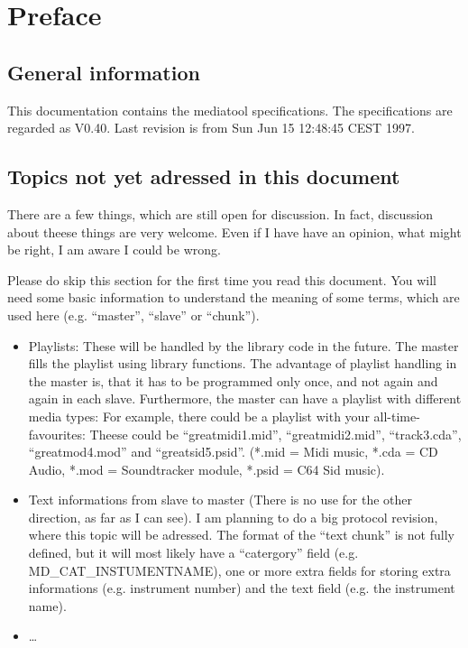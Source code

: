 

\section{Preface}


\subsection*{General information}
This documentation contains the mediatool specifications.
The specifications are regarded as V0.40. Last revision is from Sun Jun 15 12:48:45 CEST 1997.


\subsection*{Topics not yet adressed in this document}
There are a few things, which are still open for discussion. In fact, discussion about
theese things are very welcome. Even if I have have an opinion, what might be right,
I am aware I could be wrong.

Please do skip this section for the first time you read this document. You will need
some basic information to understand the meaning of some terms, which are used here
(e.g. ``master'', ``slave'' or ``chunk'').

\begin{itemize}
\item	Playlists: These will be handled by the library code in the future. The master fills
	the playlist using library functions. The advantage of playlist handling in the master
	is, that it has to be programmed only once, and not again and again in
	each slave. Furthermore, the master can have a playlist with different media types:
	For example, there could be a playlist with your all-time-favourites: Theese could
	be ``greatmidi1.mid'', ``greatmidi2.mid'', ``track3.cda'', ``greatmod4.mod'' and
	``greatsid5.psid''. (*.mid = Midi music, *.cda = CD Audio,
	*.mod = Soundtracker module, *.psid = C64 Sid music).
\item	Text informations from slave to master (There is no use for the other direction,
	as far as I can see). I am planning to do a big protocol revision, where this topic
	will be adressed. The format of the ``text chunk'' is not fully defined, but
	it will most likely have a ``catergory'' field (e.g. MD\_CAT\_INSTUMENTNAME), one
	or more extra fields for storing extra informations (e.g. instrument number) and
	the text field (e.g.  the instrument name).
\item	\ldots
\end{itemize}


